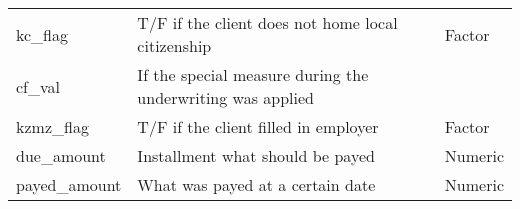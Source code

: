\documentclass[
]{article}
\begin{document}
\begin{longtable}[]{@{}lll@{}}
\begin{minipage}[t]{0.30\columnwidth}
kc\_flag\strut
\end{minipage} & \begin{minipage}[t]{0.30\columnwidth}\raggedright
T/F if the client does not home local citizenship\strut
\end{minipage} & \begin{minipage}[t]{0.30\columnwidth}\raggedright
Factor\strut
\end{minipage}\tabularnewline
\begin{minipage}[t]{0.30\columnwidth}\raggedright
cf\_val\strut
\end{minipage} & \begin{minipage}[t]{0.30\columnwidth}\raggedright
If the special measure during the underwriting was applied\strut
\end{minipage} & \begin{minipage}[t]{0.30\columnwidth}\raggedright
\strut
\end{minipage}\tabularnewline
\begin{minipage}[t]{0.30\columnwidth}\raggedright
kzmz\_flag\strut
\end{minipage} & \begin{minipage}[t]{0.30\columnwidth}\raggedright
T/F if the client filled in employer\strut
\end{minipage} & \begin{minipage}[t]{0.30\columnwidth}\raggedright
Factor\strut
\end{minipage}\tabularnewline
\begin{minipage}[t]{0.30\columnwidth}\raggedright
due\_amount\strut
\end{minipage} & \begin{minipage}[t]{0.30\columnwidth}\raggedright
Installment what should be payed\strut
\end{minipage} & \begin{minipage}[t]{0.30\columnwidth}\raggedright
Numeric\strut
\end{minipage}\tabularnewline
\begin{minipage}[t]{0.30\columnwidth}\raggedright
payed\_amount\strut
\end{minipage} & \begin{minipage}[t]{0.30\columnwidth}\raggedright
What was payed at a certain date\strut
\end{minipage} & \begin{minipage}[t]{0.30\columnwidth}\raggedright
Numeric\strut
\end{minipage}\tabularnewline
\bottomrule
\end{longtable}
\end{document}

